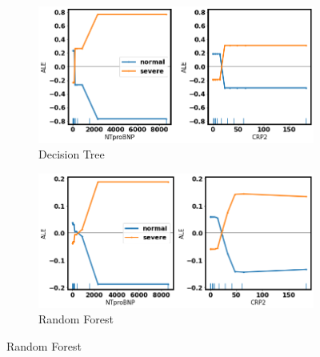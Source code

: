 \vfill


\clearpage

\null
\vfill

\begin{figure}[H]
\centering
\begin{subfigure}[b]{\textwidth}
    \centering
    \includegraphics[width=\textwidth]{figures/chapter_interp/dt_ALE_NTproBNP_CRP.png}
    \caption{Decision Tree}
    \label{fig:dt_ale}
\end{subfigure}
\hfill
\begin{subfigure}[b]{\textwidth}
    \centering
    \includegraphics[width=\textwidth]{figures/chapter_interp/rf_ALE_NTproBNP_CRP.png}
    \caption{Random Forest}
    \label{fig:rf_ale}
\end{subfigure}
\hfill
\end{figure}

